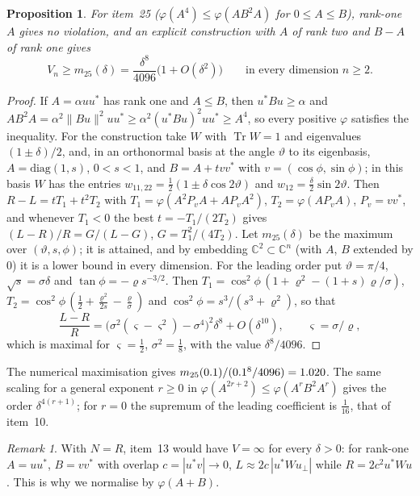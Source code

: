 \documentclass[11pt]{article}
\DeclareMathOperator{\Tr}{Tr}
\newcommand{\C}{\mathbb{C}}
\theoremstyle{plain}
\newtheorem{proposition}[theorem]{Proposition}
\theoremstyle{definition}
\theoremstyle{remark}
\newtheorem{remark}[theorem]{Remark}
\begin{document}
\begin{proposition}\label{prop:wmon}
For item~25 ($\varphi(A^4)\le\varphi(AB^2A)$ for $0\le A\le B$), rank-one $A$ gives no violation, and an explicit
construction with $A$ of rank two and $B-A$ of rank one gives
\[
  V_n\ge m_{25}(\delta)=\frac{\delta^8}{4096}\bigl(1+O(\delta^2)\bigr)\qquad\text{in every dimension }n\ge2 .
\]
\end{proposition}
\begin{proof}
If $A=\alpha uu^*$ has rank one and $A\le B$, then $u^*Bu\ge\alpha$ and $AB^2A=\alpha^2\|Bu\|^2uu^*\ge\alpha^2(u^*Bu)^2uu^*\ge
A^4$, so every positive $\varphi$ satisfies the inequality. For the construction take $W$ with $\Tr W=1$ and eigenvalues
$(1\pm\delta)/2$, and, in an orthonormal basis at the angle $\vartheta$ to its eigenbasis, $A=\mathrm{diag}(1,s)$, $0<s<1$,
and $B=A+tvv^*$ with $v=(\cos\phi,\sin\phi)$; in this basis $W$ has the entries $w_{11,22}=\frac12(1\pm\delta\cos2\vartheta)$
and $w_{12}=\frac\delta2\sin2\vartheta$. Then $R-L=tT_1+t^2T_2$ with $T_1=\varphi(A^2P_vA+AP_vA^2)$, $T_2=\varphi(AP_vA)$,
$P_v=vv^*$, and whenever $T_1<0$ the best $t=-T_1/(2T_2)$ gives $(L-R)/R=G/(L-G)$, $G=T_1^2/(4T_2)$. Let $m_{25}(\delta)$
be the maximum over $(\vartheta,s,\phi)$; it is attained, and by embedding $\C^2\subset\C^n$ (with $A$, $B$ extended by $0$)
it is a lower bound in every dimension. For the leading order put $\vartheta=\pi/4$, $\sqrt s=\sigma\delta$ and $\tan\phi=-\varrho
s^{-3/2}$. Then $T_1=\cos^2\phi\,(1+\varrho^2-(1+s)\varrho/\sigma)$, $T_2=\cos^2\phi\,(\frac12+\frac{\varrho^2}{2s}-\frac\varrho\sigma)$ and
$\cos^2\phi=s^3/(s^3+\varrho^2)$, so that
\[
  \frac{L-R}R=\bigl(\sigma^2(\varsigma-\varsigma^2)-\sigma^4\bigr)^2\delta^8+O(\delta^{10}),\qquad\varsigma=\sigma/\varrho,
\]
which is maximal for $\varsigma=\frac12$, $\sigma^2=\frac18$, with the value $\delta^8/4096$.
\end{proof}

\noindent The numerical maximisation gives $m_{25}(0.1)/(0.1^8/4096)=1.020$. The same scaling for a general
exponent $r\ge0$ in $\varphi(A^{2r+2})\le\varphi(A^rB^2A^r)$ gives the order $\delta^{4(r+1)}$; for $r=0$ the supremum of
the leading coefficient is $\frac1{16}$, that of item~10.

\begin{remark}\label{rem:13}
With $N=R$, item~13 would have $V=\infty$ for every $\delta>0$: for rank-one $A=uu^*$, $B=vv^*$ with overlap $c=|u^*v|\to0$,
$L\approx2c\,|u^*Wu_\perp|$ while $R=2c^2u^*Wu$. This is why we normalise by $\varphi(A+B)$.
\end{remark}
\end{document}
